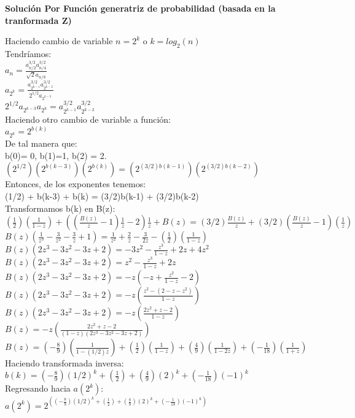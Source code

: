 \documentclass{article}
\begin{document}
\begin{enumerate}[label=\textbf{\alph*.}]
    \textbf{Soluci\'on Por Funci\'on generatriz de probabilidad (basada en la tranformada Z)}
  
    Haciendo cambio de variable $n=2^k$ o $k=log_2(n)$\\
  Tendríamos:\\
  $ a_n= \frac{a^{3/2}_{n/2}a^{3/2}_{n/4}}{\sqrt{2}a_{n/8}}$\\
  $ a_{2^k}= \frac{a^{3/2}_{2^{k-1}}a^{3/2}_{2^{k-2}}}{2^{1/2}a_{2^{k-3}}}$\\
  $2^{1/2}a_{2^{k-3}} a_{2^k}= a^{3/2}_{2^{k-1}}a^{3/2}_{2^{k-2}}$\\
  Haciendo otro cambio de variable a función:\\
  $a_{2^k}=2^{b(k)}$\\
  De tal manera que:\\
  b(0)= 0, b(1)=1, b(2) = 2.\\
  $(2^{1/2})(2^{b(k-3)}) (2^{b(k)})= (2^{(3/2)b(k-1)}) (2^{(3/2)b(k-2)})$\\
  Entonces, de los exponentes tenemos:\\
  (1/2) + b(k-3) + b(k) = (3/2)b(k-1) + (3/2)b(k-2)\\
  Transformamos b(k) en B(z):\\
  $(\frac{1}{2})(\frac{1}{1-z})+ ((\frac{B(z)}{z}-1)\frac{1}{z}-2)\frac{1}{z} + B(z) = (3/2)\frac{B(z)}{z} + (3/2)(\frac{B(z)}{z}-1)(\frac{1}{z})$\\
  $B(z)(\frac{1}{z^3}-\frac{3}{z^2}-\frac{3}{z}+1) = \frac{1}{z^2} + \frac{2}{z} - \frac{3}{2z} - (\frac{1}{2})(\frac{1}{1-z})$\\
  $B(z)(2z^3-3z^2-3z+2)=-3z^2 - \frac{z^3}{1-z}+2z+4z^2$\\
  $B(z)(2z^3-3z^2-3z+2)=z^2-\frac{z^3}{1-z}+2z$\\
  $B(z)(2z^3-3z^2-3z+2)=-z(-z+\frac{z^2}{1-z}-2)$\\
  $B(z)(2z^3-3z^2-3z+2)=-z(\frac{z^2-(2-z-z^2)}{1-z})$\\
  $B(z)(2z^3-3z^2-3z+2)=-z(\frac{2z^2+z-2}{1-z})$\\
  $B(z)=-z(\frac{2z^2+z-2}{(1-z)(2z^3-3z^2-3z+2)})$\\
  $B(z)=(-\frac{8}{9})(\frac{1}{1-(1/2)z})+(\frac{1}{2})(\frac{1}{1-z}) + (\frac{4}{9})(\frac{1}{1-2z})+(-\frac{1}{18})(\frac{1}{1+z})$\\
  Haciendo transformada inversa:\\
  $b(k) = (-\frac{8}{9})(1/2)^k+(\frac{1}{2}) + (\frac{4}{9})(2)^k+(-\frac{1}{18})(-1)^k$\\
  Regresando hacia $a(2^k)$:\\
  $a(2^k) = 2^{((-\frac{8}{9})(1/2)^k+(\frac{1}{2}) + (\frac{4}{9})(2)^k+(-\frac{1}{18})(-1)^k)}$\\
  

\end{enumerate}
\end{document}
